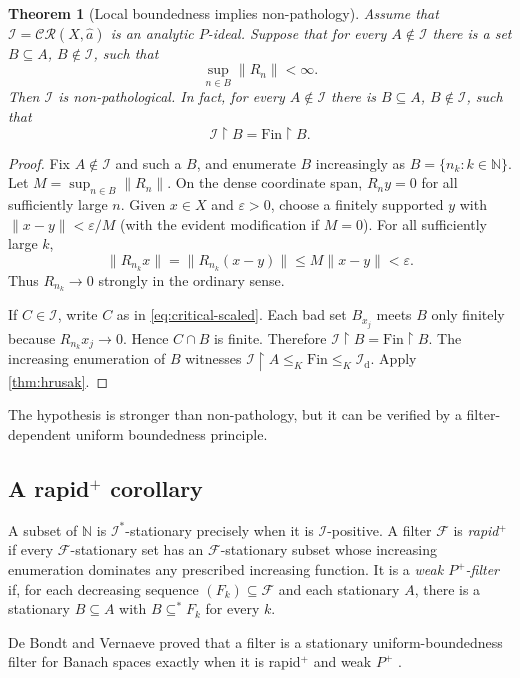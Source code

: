 \documentclass[11pt]{article}
\newtheorem{theorem}{Theorem}[section]
\theoremstyle{definition}
\theoremstyle{remark}
\newcommand{\N}{\mathbb N}
\newcommand{\I}{\mathcal I}
\newcommand{\CR}{\mathcal{CR}}
\newcommand{\Fin}{\mathrm{Fin}}
\newcommand{\Id}{\mathcal I_{\mathrm d}}
\newcommand{\restr}{\mathbin{\upharpoonright}}
\newcommand{\eps}{\varepsilon}
\begin{document}
\begin{theorem}[Local boundedness implies non-pathology]
\label{thm:bounded-positive}
Assume that $\I=\CR(X,\widehat a)$ is an analytic $P$-ideal.  Suppose that for
every $A\notin\I$ there is a set $B\subseteq A$, $B\notin\I$, such that
\[
 \sup_{n\in B}\|R_n\|<\infty.
\]
Then $\I$ is non-pathological.  In fact, for every $A\notin\I$ there is
$B\subseteq A$, $B\notin\I$, such that
\[
 \I\restr B=\Fin\restr B.
\]
\end{theorem}

\begin{proof}
Fix $A\notin\I$ and such a $B$, and enumerate $B$ increasingly as
$B=\{n_k:k\in\N\}$.  Let $M=\sup_{n\in B}\|R_n\|$.  On the dense coordinate
span, $R_ny=0$ for all sufficiently large $n$.  Given $x\in X$ and $\eps>0$,
choose a finitely supported $y$ with $\|x-y\|<\eps/M$ (with the evident
modification if $M=0$).  For all sufficiently large $k$,
\[
 \|R_{n_k}x\|=\|R_{n_k}(x-y)\|\leq M\|x-y\|<\eps.
\]
Thus $R_{n_k}\to0$ strongly in the ordinary sense.

If $C\in\I$, write $C$ as in \eqref{eq:critical-scaled}.  Each bad set
$B_{x_j}$ meets $B$ only finitely because $R_{n_k}x_j\to0$.  Hence
$C\cap B$ is finite.  Therefore $\I\restr B=\Fin\restr B$.
The increasing enumeration of $B$ witnesses
$\I\restr A\leq_K\Fin\leq_K\Id$.  Apply \cref{thm:hrusak}.
\end{proof}

The hypothesis is stronger than non-pathology, but it can be verified by a
filter-dependent uniform boundedness principle.

\subsection{A rapid$^+$ corollary}

A subset of $\N$ is $\I^*$-stationary precisely when it is $\I$-positive.
A filter $\mathcal F$ is \emph{rapid$^+$} if every $\mathcal F$-stationary set
has an $\mathcal F$-stationary subset whose increasing enumeration dominates
any prescribed increasing function.  It is a \emph{weak $P^+$-filter} if,
for each decreasing sequence $(F_k)\subseteq\mathcal F$ and each stationary
$A$, there is a stationary $B\subseteq A$ with $B\subseteq^*F_k$ for every
$k$.

De Bondt and Vernaeve proved that a filter is a stationary uniform-boundedness
filter for Banach spaces exactly when it is rapid$^+$ and weak $P^+$
\cite[Theorem 5.2]{DeBondtVernaeve}.
\end{document}
